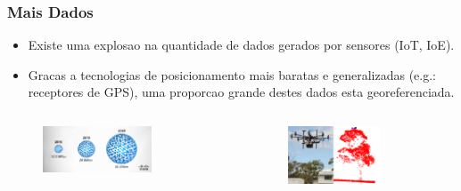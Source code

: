 \documentclass[hyperref={pdfpagelabels=true}]{beamer}
\begin{document}
\begin{frame}
\frametitle{Mais Dados}
      \begin{itemize}
        \item<1->Existe uma explosao na quantidade de dados gerados por sensores (IoT, IoE).
        \item<2->Gracas a tecnologias de posicionamento mais baratas e generalizadas (e.g.: receptores de GPS), uma proporcao grande destes dados esta georeferenciada.
      \end{itemize}                
      
\begin{columns}
  \begin{column}{0.5\textwidth}
    \begin{figure}  
	\includegraphics[width=0.7\textwidth]{cisco.png}\\
       \end{figure}             
  \end{column}
  \begin{column}{0.5\textwidth}
      \begin{figure}  
	\includegraphics[width=0.7\textwidth]{drones.png}\\
       \end{figure}  
  \end{column}  
\end{columns}

\end{frame}
\end{document}
